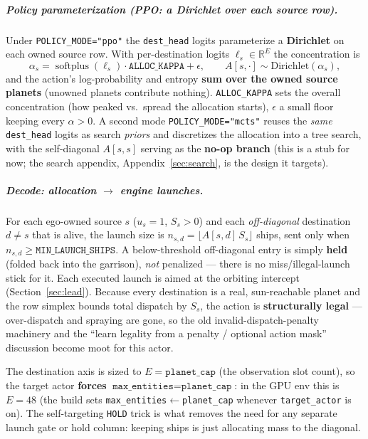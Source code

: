 \documentclass[11pt]{article}
\newcommand{\R}{\mathbb{R}}
\begin{document}
\subparagraph{Policy parameterization (PPO: a Dirichlet over each source row).} Under
\texttt{POLICY\_MODE="ppo"} the \texttt{dest\_head} logits parameterize a \textbf{Dirichlet} on each
owned source row. With per-destination logits $\ell_{s}\in\R^{E}$ the concentration is
\begin{equation}
\alpha_{s} = \operatorname{softplus}(\ell_{s})\cdot\texttt{ALLOC\_KAPPA} + \epsilon,
\qquad
A[s,\cdot] \sim \mathrm{Dirichlet}(\alpha_{s}),
\end{equation}
and the action's log-probability and entropy \textbf{sum over the owned source planets} (unowned
planets contribute nothing). \texttt{ALLOC\_KAPPA} sets the overall concentration (how peaked vs.\
spread the allocation starts), $\epsilon$ a small floor keeping every $\alpha>0$. A second mode
\texttt{POLICY\_MODE="mcts"} reuses the \emph{same} \texttt{dest\_head} logits as search \emph{priors}
and discretizes the allocation into a tree search, with the self-diagonal $A[s,s]$ serving as the
\textbf{no-op branch} (this is a stub for now; the search appendix, Appendix~\ref{sec:search}, is the
design it targets).

\subparagraph{Decode: allocation $\to$ engine launches.} For each ego-owned source $s$ ($u_s=1$,
$S_s>0$) and each \emph{off-diagonal} destination $d\neq s$ that is alive, the launch size is
$n_{s,d}=\lfloor A[s,d]\,S_s\rfloor$ ships, sent only when $n_{s,d}\ge\texttt{MIN\_LAUNCH\_SHIPS}$.
A below-threshold off-diagonal entry is simply \textbf{held} (folded back into the garrison), \emph{not}
penalized --- there is no miss/illegal-launch stick for it. Each executed launch is aimed at the
orbiting intercept (Section~\ref{sec:lead}). Because every destination is a real, sun-reachable planet
and the row simplex bounds total dispatch by $S_s$, the action is \textbf{structurally legal} ---
over-dispatch and spraying are gone, so the old invalid-dispatch-penalty machinery and the ``learn
legality from a penalty / optional action mask'' discussion become moot for this actor.

The destination axis is sized to $E=\texttt{planet\_cap}$ (the observation slot count), so the target
actor \textbf{forces} $\texttt{max\_entities}=\texttt{planet\_cap}$: in the GPU env this is $E=48$
(the build sets \texttt{max\_entities}$\leftarrow$\texttt{planet\_cap} whenever \texttt{target\_actor}
is on). The self-targeting \texttt{HOLD} trick is what removes the need for any separate launch gate or
hold column: keeping ships is just allocating mass to the diagonal.
\end{document}
